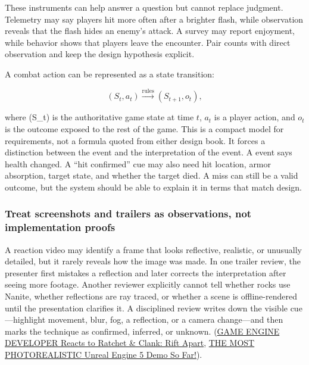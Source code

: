 These instruments can help answer a question but cannot replace judgment. Telemetry may say players hit more often after a brighter flash, while observation reveals that the flash hides an enemy's attack. A survey may report enjoyment, while behavior shows that players leave the encounter. Pair counts with direct observation and keep the design hypothesis explicit.

A combat action can be represented as a state transition:

\[
(S_t, a_t) \xrightarrow{\text{rules}} (S_{t+1}, o_t),
\]

where (S\_t) is the authoritative game state at time \(t\), \(a_t\) is a player action, and \(o_t\) is the outcome exposed to the rest of the game. This is a compact model for requirements, not a formula quoted from either design book. It forces a distinction between the event and the interpretation of the event. A  event says health changed. A ``hit confirmed'' cue may also need hit location, armor absorption, target state, and whether the target died. A miss can still be a valid outcome, but the system should be able to explain it in terms that match design.

\subsubsection{Treat screenshots and trailers as observations, not implementation proofs}\label{05-engine-i-ch009-treat-screenshots-and-trailers-as-observations-not-implementation-proofs}

\hypertarget{05-engine-i-ch009-treat-screenshots-and-trailers-as-observations-not-implementation-proofs}{}

A reaction video may identify a frame that looks reflective, realistic, or unusually detailed, but it rarely reveals how the image was made. In one trailer review, the presenter first mistakes a reflection and later corrects the interpretation after seeing more footage. Another reviewer explicitly cannot tell whether rocks use Nanite, whether reflections are ray traced, or whether a scene is offline-rendered until the presentation clarifies it. A disciplined review writes down the visible cue---highlight movement, blur, fog, a reflection, or a camera change---and then marks the technique as confirmed, inferred, or unknown. (\href{https://www.youtube.com/watch?v=qCSyy5BTDuc&t=0m0s}{GAME ENGINE DEVELOPER Reacts to Ratchet \& Clank: Rift Apart}, \href{https://www.youtube.com/watch?v=jbEfCcl7gOw&t=0m0s}{THE MOST PHOTOREALISTIC Unreal Engine 5 Demo So Far!}).

